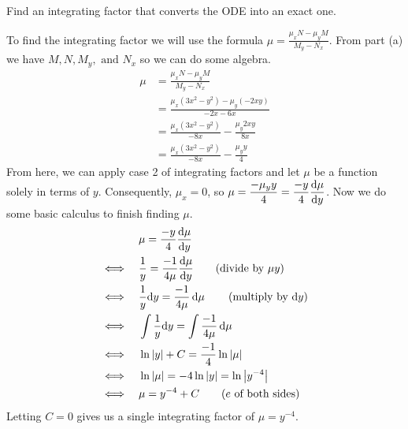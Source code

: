 Find an integrating factor that converts the ODE into an exact one.

\nnl To find the integrating factor we will use the formula $\displaystyle \mu = \frac{\mu_x N - \mu_y M}{M_y - N_x}$. From part (a) we have $M, N, M_y, \text{ and } N_x$ so we can do some algebra.
\begin{align*}
    \mu &= \frac{\mu_x N - \mu_y M}{M_y - N_x}\\
    &= \frac{\mu_x (3x^2-y^2) - \mu_y (-2xy)}{-2x - 6x} \tag{substition} \\
    &= \frac{\mu_x (3x^2-y^2)}{-8x} - \frac{\mu_y 2xy}{8x} \tag{linearity}\\
    &= \frac{\mu_x (3x^2-y^2)}{-8x} - \frac{\mu_y y}{4} \tag{like terms}
\end{align*}
From here, we can apply case 2 of integrating factors and let $\mu$ be a function solely in terms of $y$. Consequently, $\mu_x = 0$, so $\mu = \dfrac{-\mu_y y}{4} = \displaystyle \frac{-y}{4}\dv{\mu}{y}$. Now we do some basic calculus to finish finding $\mu$. 
\begin{align*}
    & \quad \mu = \frac{-y}{4}\dv{\mu}{y}\\
    \iff & \quad \frac{1}{y} = \frac{-1}{4 \mu} \dv{\mu}{y} \tag{divide by $\mu y$}\\
    \iff & \quad \frac{1}{y} \dd y = \frac{-1}{4 \mu} \dd{\mu} \tag{multiply by $\dd y$}\\
    \iff & \quad \int \frac{1}{y} \dd y = \int \frac{-1}{4 \mu} \dd{\mu} \\
    \iff & \quad \ln \abs{y} + C = \frac{-1}{4} \ln \abs{\mu}\\
    \iff & \quad \ln \abs{\mu} = -4 \ln \abs{y} = \ln \abs{y^{-4}}\\
    \iff & \quad \mu = y^{-4} + C \tag{$e$ of both sides}
\end{align*}
Letting $C = 0$ gives us a single integrating factor of $\mu = y^{-4}$.